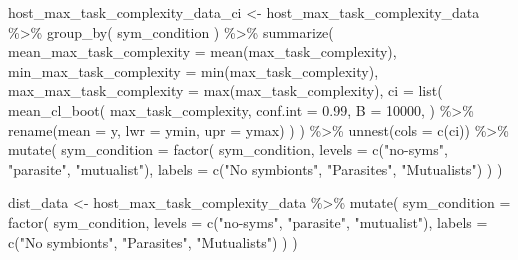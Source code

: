 \documentclass[
]{book}
\newenvironment{Shaded}{\begin{snugshade}}{\end{snugshade}}
\newcommand{\AttributeTok}[1]{\textcolor[rgb]{0.77,0.63,0.00}{#1}}
\newcommand{\DecValTok}[1]{\textcolor[rgb]{0.00,0.00,0.81}{#1}}
\newcommand{\FloatTok}[1]{\textcolor[rgb]{0.00,0.00,0.81}{#1}}
\newcommand{\FunctionTok}[1]{\textcolor[rgb]{0.00,0.00,0.00}{#1}}
\newcommand{\NormalTok}[1]{#1}
\newcommand{\OtherTok}[1]{\textcolor[rgb]{0.56,0.35,0.01}{#1}}
\newcommand{\SpecialCharTok}[1]{\textcolor[rgb]{0.00,0.00,0.00}{#1}}
\newcommand{\StringTok}[1]{\textcolor[rgb]{0.31,0.60,0.02}{#1}}
\begin{document}
\begin{Shaded}
\begin{Highlighting}[]
\NormalTok{host\_max\_task\_complexity\_data\_ci }\OtherTok{\textless{}{-}}\NormalTok{ host\_max\_task\_complexity\_data }\SpecialCharTok{\%\textgreater{}\%}
  \FunctionTok{group\_by}\NormalTok{(}
\NormalTok{    sym\_condition}
\NormalTok{  ) }\SpecialCharTok{\%\textgreater{}\%}
  \FunctionTok{summarize}\NormalTok{(}
    \AttributeTok{mean\_max\_task\_complexity =} \FunctionTok{mean}\NormalTok{(max\_task\_complexity),}
    \AttributeTok{min\_max\_task\_complexity =} \FunctionTok{min}\NormalTok{(max\_task\_complexity),}
    \AttributeTok{max\_max\_task\_complexity =} \FunctionTok{max}\NormalTok{(max\_task\_complexity),}
    \AttributeTok{ci =} \FunctionTok{list}\NormalTok{(}
      \FunctionTok{mean\_cl\_boot}\NormalTok{(}
\NormalTok{        max\_task\_complexity,}
        \AttributeTok{conf.int =} \FloatTok{0.99}\NormalTok{,}
        \AttributeTok{B =} \DecValTok{10000}\NormalTok{,}
\NormalTok{      ) }\SpecialCharTok{\%\textgreater{}\%} \FunctionTok{rename}\NormalTok{(}\AttributeTok{mean =}\NormalTok{ y, }\AttributeTok{lwr =}\NormalTok{ ymin, }\AttributeTok{upr =}\NormalTok{ ymax)}
\NormalTok{    )}
\NormalTok{  ) }\SpecialCharTok{\%\textgreater{}\%}
  \FunctionTok{unnest}\NormalTok{(}\AttributeTok{cols =} \FunctionTok{c}\NormalTok{(ci)) }\SpecialCharTok{\%\textgreater{}\%}
  \FunctionTok{mutate}\NormalTok{(}
    \AttributeTok{sym\_condition =} \FunctionTok{factor}\NormalTok{(}
\NormalTok{      sym\_condition,}
      \AttributeTok{levels =} \FunctionTok{c}\NormalTok{(}\StringTok{"no{-}syms"}\NormalTok{, }\StringTok{"parasite"}\NormalTok{, }\StringTok{"mutualist"}\NormalTok{),}
      \AttributeTok{labels =} \FunctionTok{c}\NormalTok{(}\StringTok{"No symbionts"}\NormalTok{, }\StringTok{"Parasites"}\NormalTok{, }\StringTok{"Mutualists"}\NormalTok{)}
\NormalTok{    )}
\NormalTok{  )}

\NormalTok{dist\_data }\OtherTok{\textless{}{-}}\NormalTok{ host\_max\_task\_complexity\_data }\SpecialCharTok{\%\textgreater{}\%}
  \FunctionTok{mutate}\NormalTok{(}
    \AttributeTok{sym\_condition =} \FunctionTok{factor}\NormalTok{(}
\NormalTok{      sym\_condition,}
      \AttributeTok{levels =} \FunctionTok{c}\NormalTok{(}\StringTok{"no{-}syms"}\NormalTok{, }\StringTok{"parasite"}\NormalTok{, }\StringTok{"mutualist"}\NormalTok{),}
      \AttributeTok{labels =} \FunctionTok{c}\NormalTok{(}\StringTok{"No symbionts"}\NormalTok{, }\StringTok{"Parasites"}\NormalTok{, }\StringTok{"Mutualists"}\NormalTok{)}
\NormalTok{    )}
\NormalTok{  )}


\end{Highlighting}
\end{Shaded}
\end{document}
